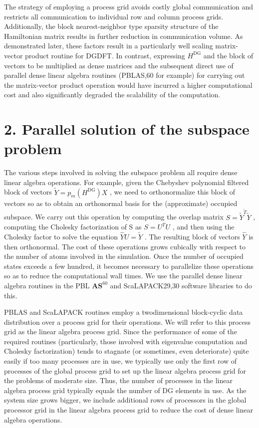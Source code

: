 \documentclass[
  10
]{article}
\begin{document}
The strategy of employing a process grid avoids costly global
communication and restricts all communication to individual row and
column process grids. Additionally, the block nearest-neighbor type
sparsity structure of the Hamiltonian matrix results in further
reduction in communication volume. As demonstrated later, these factors
result in a particularly well scaling matrix-vector product routine for
DGDFT. In contrast, expressing \(H ^ { \mathrm { D G } }\) and the block
of vectors to be multiplied as dense matrices and the subsequent direct
use of parallel dense linear algebra routines (PBLAS,60 for example) for
carrying out the matrix-vector product operation would have incurred a
higher computational cost and also significantly degraded the
scalability of the computation.

\section{2. Parallel solution of the subspace
problem}\label{parallel-solution-of-the-subspace-problem}

The various steps involved in solving the subspace problem all require
dense linear algebra operations. For example, given the Chebyshev
polynomial filtered block of vectors
\(\tilde { Y } = p _ { m } ( H ^ { \mathrm { D G } } ) X\) , we need to
orthonormalize this block of vectors so as to obtain an orthonormal
basis for the (approximate) occupied subspace. We carry out this
operation by computing the overlap matrix
\(S = \tilde { Y } ^ { \tilde { T } } \tilde { Y }\) , computing the
Cholesky factorization of S as \(S = U ^ { T } U\) , and then using the
Cholesky factor to solve the equation
\({ \hat { Y } } U = { \tilde { Y } }\) . The resulting block of vectors
\(\hat { Y }\) is then orthonormal. The cost of these operations grows
cubically with respect to the number of atoms involved in the
simulation. Once the number of occupied states exceeds a few hundred, it
becomes necessary to parallelize these operations so as to reduce the
computational wall times. We use the parallel dense linear algebra
routines in the PBL \(\mathbf { A } \mathbf { S } ^ { 6 0 }\) and
ScaLAPACK29,30 software libraries to do this.

PBLAS and ScaLAPACK routines employ a twodimensional block-cyclic data
distribution over a process grid for their operations. We will refer to
this process grid as the linear algebra process grid. Since the
performance of some of the required routines (particularly, those
involved with eigenvalue computation and Cholesky factorization) tends
to stagnate (or sometimes, even deteriorate) quite easily if too many
processes are in use, we typically use only the first row of processes
of the global process grid to set up the linear algebra process grid for
the problems of moderate size. Thus, the number of processes in the
linear algebra process grid typically equals the number of DG elements
in use. As the system size grows bigger, we include additional rows of
processors in the global processor grid in the linear algebra process
grid to reduce the cost of dense linear algebra operations.
\end{document}
